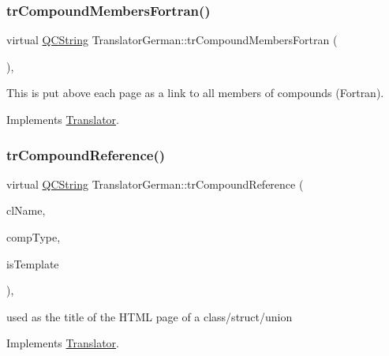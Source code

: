 \subsubsection{\texorpdfstring{trCompoundMembersFortran()}{trCompoundMembersFortran()}}
{\footnotesize\ttfamily virtual \mbox{\hyperlink{class_q_c_string}{Q\+C\+String}} Translator\+German\+::tr\+Compound\+Members\+Fortran (\begin{DoxyParamCaption}{ }\end{DoxyParamCaption})\hspace{0.3cm}{\ttfamily [inline]}, {\ttfamily [virtual]}}

This is put above each page as a link to all members of compounds (Fortran). 

Implements \mbox{\hyperlink{class_translator}{Translator}}.

\mbox{\label{class_translator_german_a33e3f35b47e446fcff43e89401ee5caf}} 
\subsubsection{\texorpdfstring{trCompoundReference()}{trCompoundReference()}}
{\footnotesize\ttfamily virtual \mbox{\hyperlink{class_q_c_string}{Q\+C\+String}} Translator\+German\+::tr\+Compound\+Reference (\begin{DoxyParamCaption}\item[{const char $\ast$}]{cl\+Name,  }\item[{\mbox{\hyperlink{class_class_def_ae70cf86d35fe954a94c566fbcfc87939}{Class\+Def\+::\+Compound\+Type}}}]{comp\+Type,  }\item[{bool}]{is\+Template }\end{DoxyParamCaption})\hspace{0.3cm}{\ttfamily [inline]}, {\ttfamily [virtual]}}

used as the title of the H\+T\+ML page of a class/struct/union 

Implements \mbox{\hyperlink{class_translator}{Translator}}.

\mbox{\label{class_translator_german_a6914d27eb6fad4c153ec32abff71705a}} 
